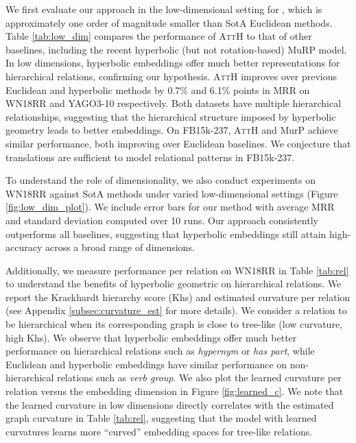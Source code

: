 \documentclass[11pt,a4paper]{article}
\newcommand{\model}[1]{\textsc{AttH}}
\begin{document}
We first evaluate our approach in the low-dimensional setting for , which is approximately one order of magnitude smaller than SotA Euclidean methods.
Table \ref{tab:low_dim} compares the performance of \model{} to that of other baselines, including the recent hyperbolic (but not rotation-based) {MuRP} model. 
In low dimensions, hyperbolic embeddings offer much better representations for hierarchical relations, confirming our hypothesis.
\model{} improves over previous Euclidean and hyperbolic methods by 0.7\% and 6.1\% points in MRR on WN18RR and YAGO3-10 respectively. 
Both datasets have multiple hierarchical relationships, suggesting that the hierarchical structure imposed by hyperbolic geometry leads to better embeddings. 
On FB15k-237, \model{} and MurP achieve similar performance, both improving over Euclidean baselines. 
We conjecture that translations are sufficient to model relational patterns in FB15k-237.

To understand the role of dimensionality, we also conduct experiments on WN18RR against SotA methods under varied low-dimensional settings (Figure \ref{fig:low_dim_plot}).
We include error bars for our method with average MRR and standard deviation computed over 10 runs. 
Our approach consistently outperforms all baselines, suggesting that hyperbolic embeddings still attain high-accuracy across a broad range of dimensions. 

Additionally, we measure performance per relation on WN18RR in Table \ref{tab:rel} to understand the benefits of hyperbolic geometric on hierarchical relations. 
We report the Krackhardt hierarchy score (Khs) \cite{balavzevic2019multi} and estimated curvature per relation  (see Appendix \ref{subsec:curvature_est} for more details).
We consider a relation to be hierarchical when its corresponding graph is close to tree-like (low curvature, high Khs).
We observe that hyperbolic embeddings offer much better performance on hierarchical relations such as \textit{hypernym} or \textit{has part}, while Euclidean and hyperbolic embeddings have similar performance on non-hierarchical relations such as \textit{verb group}.
We also plot the learned curvature per relation versus the embedding dimension in Figure \ref{fig:learned_c}. 
We note that the learned curvature in low dimensions directly correlates with the estimated graph curvature  in Table \ref{tab:rel}, suggesting that the model with learned curvatures learns more ``curved'' embedding spaces for tree-like relations. 
\end{document}
